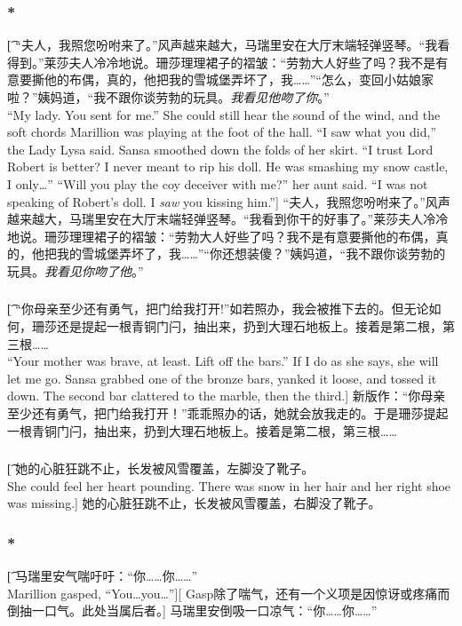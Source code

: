 \documentclass[12pt,a4paper]{article}
\begin{document}
\subsubsection{\color{red}*}\t[
	“夫人，我照您吩咐来了。”风声越来越大，马瑞里安在大厅末端轻弹竖琴。“我看得到。”莱莎夫人冷冷地说。珊莎理理裙子的褶皱：“劳勃大人好些了吗？我不是有意要撕他的布偶，真的，他把我的雪城堡弄坏了，我……”“怎么，变回小姑娘家啦？”姨妈道，“我不跟你谈劳勃的玩具。\emph{我看见他吻了你}。”\\
	“My lady. You sent for me.” She could still hear the sound of the wind, and the soft chords Marillion was playing at the foot of the hall. “I saw what you did,” the Lady Lysa said. Sansa smoothed down the folds of her skirt. “I trust Lord Robert is better? I never meant to rip his doll. He was smashing my snow castle, I only\ldots” “Will you play the coy deceiver with me?” her aunt said. “I was not speaking of Robert's doll. I \emph{saw} you kissing him.”]
	“夫人，我照您吩咐来了。”风声越来越大，马瑞里安在大厅末端轻弹竖琴。“我看到你干的好事了。”莱莎夫人冷冷地说。珊莎理理裙子的褶皱：“劳勃大人好些了吗？我不是有意要撕他的布偶，真的，他把我的雪城堡弄坏了，我……”“你还想装傻？”姨妈道，“我不跟你谈劳勃的玩具。\emph{我看见你吻了他}。”
	
\subsubsection{}\t[
	“你母亲至少还有勇气，把门给我打开!”如若照办，我会被推下去的。但无论如何，珊莎还是提起一根青铜门闩，抽出来，扔到大理石地板上。接着是第二根，第三根…… \\
	“Your mother was brave, at least. Lift off the bars.” If I do as she says, she will let me go. Sansa grabbed one of the bronze bars, yanked it loose, and tossed it down. The second bar clattered to the marble, then the third.]
	新版作：“你母亲至少还有勇气，把门给我打开！”乖乖照办的话，她就会放我走的。于是珊莎提起一根青铜门闩，抽出来，扔到大理石地板上。接着是第二根，第三根……
	
\subsubsection{}\t[
	她的心脏狂跳不止，长发被风雪覆盖，左脚没了靴子。\\
	She could feel her heart pounding. There was snow in her hair and her right shoe was missing.]
	她的心脏狂跳不止，长发被风雪覆盖，右脚没了靴子。
	
\subsubsection{\color{red}*}\t[
	马瑞里安气喘吁吁：“你……你……”\\
	Marillion gasped, “You\ldots you\ldots”][
	Gasp除了喘气，还有一个义项是因惊讶或疼痛而倒抽一口气。此处当属后者。]
	马瑞里安倒吸一口凉气：“你……你……” 
	
\end{document}

